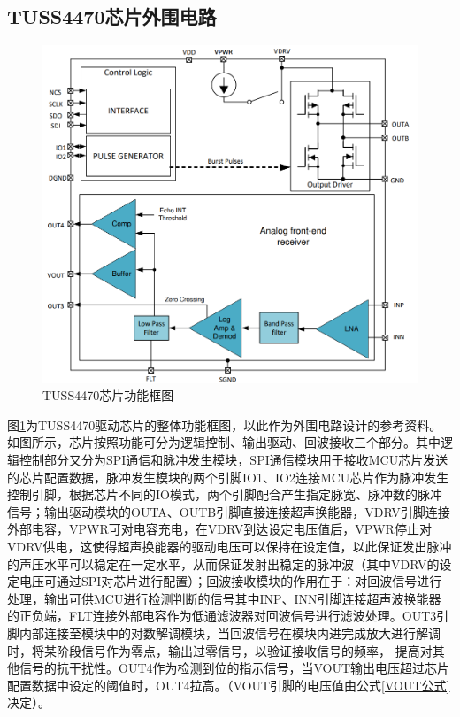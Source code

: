  	\newpage
    \subsection{TUSS4470芯片外围电路}
    
    
    \begin{figure}[ht]
		\centering
		\includegraphics[width=12cm]{figure/Function Block Diagram.png}
		\caption{TUSS4470芯片功能框图}
		\label{TUSS4470芯片功能框图}%
\end{figure}
 图\ref{TUSS4470芯片功能框图}为TUSS4470驱动芯片的整体功能框图，以此作为外围电路设计的参考资料。如图所示，芯片按照功能可分为逻辑控制、输出驱动、回波接收三个部分。其中逻辑控制部分又分为SPI通信和脉冲发生模块，SPI通信模块用于接收MCU芯片发送的芯片配置数据，脉冲发生模块的两个引脚IO1、IO2连接MCU芯片作为脉冲发生控制引脚，根据芯片不同的IO模式，两个引脚配合产生指定脉宽、脉冲数的脉冲信号；输出驱动模块的OUTA、OUTB引脚直接连接超声换能器，VDRV引脚连接外部电容，VPWR可对电容充电，在VDRV到达设定电压值后，VPWR停止对VDRV供电，这使得超声换能器的驱动电压可以保持在设定值，以此保证发出脉冲的声压水平可以稳定在一定水平，从而保证发射出稳定的脉冲波（其中VDRV的设定电压可通过SPI对芯片进行配置）；回波接收模块的作用在于：对回波信号进行处理，输出可供MCU进行检测判断的信号其中INP、INN引脚连接超声波换能器的正负端，FLT连接外部电容作为低通滤波器对回波信号进行滤波处理。OUT3引脚内部连接至模块中的对数解调模块，当回波信号在模块内进完成放大进行解调时，将某阶段信号作为零点，输出过零信号，以验证接收信号的频率， 提高对其他信号的抗干扰性。OUT4作为检测到位的指示信号，当VOUT输出电压超过芯片配置数据中设定的阈值时，OUT4拉高。（VOUT引脚的电压值由公式\ref{VOUT公式}决定）。
  
